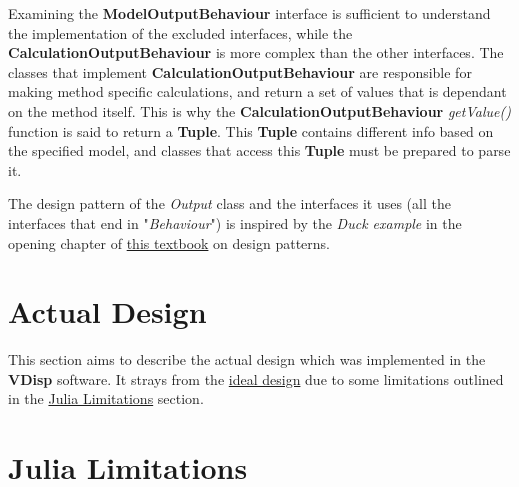 \documentclass[11pt,fleqn]{article}
\newcommand{\indentpar}{\phantom{=}}
\begin{document}
    \indentpar Examining the \textbf{ModelOutputBehaviour} interface is sufficient
    to understand the implementation of the excluded interfaces, while the \textbf{CalculationOutputBehaviour}
    is more complex than the other interfaces. The classes that implement \textbf{CalculationOutputBehaviour}
    are responsible for making method specific calculations, and return a set of values that is dependant on 
    the method itself. This is why the \textbf{CalculationOutputBehaviour} \emph{getValue()} function is said to
    return a \textbf{Tuple}. This \textbf{Tuple} contains different info based on the specified model, and classes
    that access this \textbf{Tuple} must be prepared to parse it.

    \indentpar The design pattern of the \emph{Output} class and the interfaces it uses (all the interfaces that 
    end in "\emph{Behaviour}") is inspired by the \emph{Duck example} in the opening chapter of \href{https://github.com/ksatria/MK-Design-Pattern/blob/master/Ebook/Head%20First%20Design%20Patterns.pdf}{this textbook}
    on design patterns.
    
    \section*{Actual Design} \label{actualDesign}

    \indentpar This section aims to describe the actual design which was implemented
    in the \textbf{VDisp} software. It strays from the \hyperref[initialDesign]{ideal design} due
    to some limitations outlined in the \hyperref[juliaLimits]{Julia Limitations} section.\\
    
    \section*{Julia Limitations} \label{juliaLimits}
\end{document}
